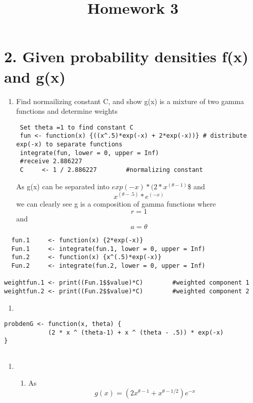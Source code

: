 \documentclass[]{article}
\title{Homework 3}
\author{}
\date{}
\providecommand{\tightlist}{%
  \setlength{\itemsep}{0pt}\setlength{\parskip}{0pt}}
\begin{document}
\maketitle

\section{2. Given probability densities f(x) and
g(x)}\label{given-probability-densities-fx-and-gx}

\begin{enumerate}
\def\labelenumi{\alph{enumi})}
\item
  Find normailizing constant C, and show g(x) is a mixture of two gamma
  functions and determine weights

\begin{verbatim}
 Set theta =1 to find constant C
 fun <- function(x) {((x^.5)*exp(-x) + 2*exp(-x))} # distribute exp(-x) to separate functions
 integrate(fun, lower = 0, upper = Inf)
 #receive 2.886227
 C     <- 1 / 2.886227        #normalizing constant
\end{verbatim}

  As g(x) can be separated into \(exp(-x) * (2*x^{(\theta -1)}\)\$ and
  \[x ^ (\theta - .5) * e^{(-x)} \] we can clearly see g is a
  composition of gamma functions where \[r = 1\] and \[a = \theta\]
\end{enumerate}

\begin{verbatim}
  fun.1     <- function(x) {2*exp(-x)}
  Fun.1     <- integrate(fun.1, lower = 0, upper = Inf)
  fun.2     <- function(x) {x^(.5)*exp(-x)}
  Fun.2     <- integrate(fun.2, lower = 0, upper = Inf)
  
weightfun.1 <- print((Fun.1$$value)*C)        #weighted component 1
weightfun.2 <- print((Fun.2$$value)*C)        #weighted component 2
\end{verbatim}

\begin{enumerate}
\def\labelenumi{\alph{enumi})}
\setcounter{enumi}{1}
\item
\end{enumerate}

\begin{verbatim}
probdenG <- function(x, theta) {
            (2 * x ^ (theta-1) + x ^ (theta - .5)) * exp(-x)
}
 
\end{verbatim}

\begin{enumerate}
\def\labelenumi{\arabic{enumi})}
\setcounter{enumi}{1}
\item
  \begin{enumerate}
  \def\labelenumii{\alph{enumii})}
  \tightlist
  \item
    As \[g(x) = (2x^{\theta-1}+x^{\theta-1/2})e^{-x}\]
  \end{enumerate}
\end{enumerate}
\end{document}
